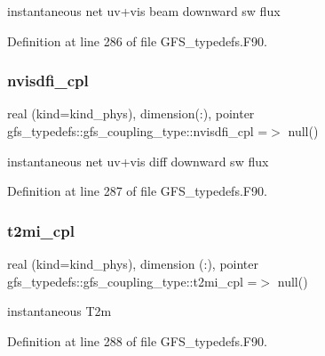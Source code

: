 instantaneous net uv+vis beam downward sw flux 



Definition at line 286 of file G\+F\+S\+\_\+typedefs.\+F90.

\mbox{\label{structgfs__typedefs_1_1gfs__coupling__type_a4d1be4348c19eb837dbdeb3f08a0158d}} 
\subsubsection{nvisdfi\+\_\+cpl}
{\footnotesize\ttfamily real (kind=kind\+\_\+phys), dimension(\+:), pointer gfs\+\_\+typedefs\+::gfs\+\_\+coupling\+\_\+type\+::nvisdfi\+\_\+cpl =$>$ null()}



instantaneous net uv+vis diff downward sw flux 



Definition at line 287 of file G\+F\+S\+\_\+typedefs.\+F90.

\mbox{\label{structgfs__typedefs_1_1gfs__coupling__type_a2c2344e4bd306442eeed8c8a21d09881}} 
\subsubsection{t2mi\+\_\+cpl}
{\footnotesize\ttfamily real (kind=kind\+\_\+phys), dimension   (\+:), pointer gfs\+\_\+typedefs\+::gfs\+\_\+coupling\+\_\+type\+::t2mi\+\_\+cpl =$>$ null()}



instantaneous T2m 



Definition at line 288 of file G\+F\+S\+\_\+typedefs.\+F90.

\mbox{\label{structgfs__typedefs_1_1gfs__coupling__type_a2f4a34c335ae2c6f664046e20f3c0478}} 
